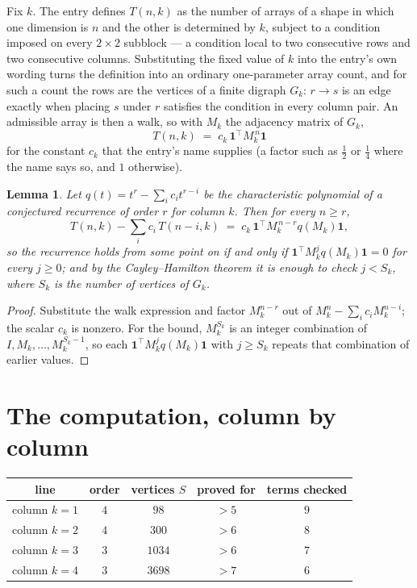 \documentclass[11pt,a4paper]{article}
\theoremstyle{plain}
\newtheorem{lemma}[theorem]{Lemma}
\theoremstyle{definition}
\begin{document}
Fix $k$. The entry defines $T(n,k)$ as the number of arrays of a shape in which one dimension
is $n$ and the other is determined by $k$, subject to a condition imposed on every
$2\times2$ subblock --- a condition local to two consecutive rows and two consecutive columns.
Substituting the fixed value of $k$ into the entry's own wording turns the definition into an
ordinary one-parameter array count, and for such a count the rows are the vertices of a finite
digraph $G_k$: $r\to s$ is an edge exactly when placing $s$ under $r$ satisfies the condition
in every column pair. An admissible array is then a walk, so with $M_k$ the adjacency matrix
of $G_k$,
\[
T(n,k)\;=\;c_k\,\mathbf{1}^{\!\top}M_k^{\,n}\mathbf{1}
\]
for the constant $c_k$ that the entry's name supplies (a factor such as $\tfrac12$ or
$\tfrac14$ where the name says so, and $1$ otherwise).

\begin{lemma}\label{lem:crit}
Let $q(t)=t^{r}-\sum_i c_it^{r-i}$ be the characteristic polynomial of a conjectured
recurrence of order $r$ for column $k$. Then for every $n\ge r$,
\[
T(n,k)-\sum_i c_i\,T(n-i,k)\;=\;c_k\,\mathbf{1}^{\!\top}M_k^{\,n-r}q(M_k)\mathbf{1},
\]
so the recurrence holds from some point on if and only if
$\mathbf{1}^{\!\top}M_k^{j}q(M_k)\mathbf{1}=0$ for every $j\ge0$; and by the
Cayley--Hamilton theorem it is enough to check $j<S_k$, where $S_k$ is the number of vertices
of $G_k$.
\end{lemma}

\begin{proof}
Substitute the walk expression and factor $M_k^{n-r}$ out of $M_k^{n}-\sum_ic_iM_k^{n-i}$;
the scalar $c_k$ is nonzero. For the bound, $M_k^{S_k}$ is an integer combination of
$I,M_k,\dots,M_k^{S_k-1}$, so each $\mathbf{1}^{\!\top}M_k^{j}q(M_k)\mathbf{1}$ with
$j\ge S_k$ repeats that combination of earlier values.
\end{proof}

\section{The computation, column by column}

\begin{center}
\begin{tabular}{ccccc}
line & order & vertices $S$ & proved for & terms checked \\ \hline
column $k$$=1$ & $4$ & $98$ & $>5$ & $9$ \\
column $k$$=2$ & $4$ & $300$ & $>6$ & $8$ \\
column $k$$=3$ & $3$ & $1034$ & $>6$ & $7$ \\
column $k$$=4$ & $3$ & $3698$ & $>7$ & $6$ \\
\end{tabular}
\end{center}
\end{document}
